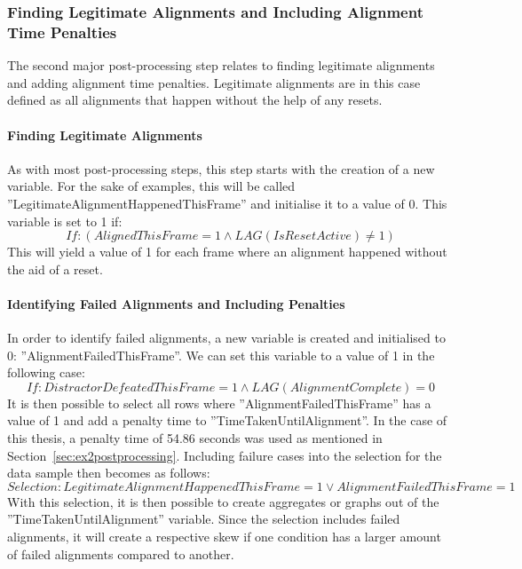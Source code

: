\subsubsection{Finding Legitimate Alignments and Including Alignment Time Penalties}
The second major post-processing step relates to finding legitimate alignments and adding alignment time penalties. Legitimate alignments are in this case defined as all alignments that happen without the help of any resets.  

\paragraph{Finding Legitimate Alignments}
As with most post-processing steps, this step starts with the creation of a new variable. For the sake of examples, this will be called ''LegitimateAlignmentHappenedThisFrame'' and initialise it to a value of 0. This variable is set to 1 if:
$$
If: (AlignedThisFrame = 1 \land LAG(IsResetActive) \neq 1)
$$
This will yield a value of 1 for each frame where an alignment happened without the aid of a reset. 

\paragraph{Identifying Failed Alignments and Including Penalties}
In order to identify failed alignments, a new variable is created and initialised to 0: ''AlignmentFailedThisFrame''. We can set this variable to a value of 1 in the following case:
$$
If: DistractorDefeatedThisFrame = 1 \land LAG(AlignmentComplete) = 0
$$
It is then possible to select all rows where ''AlignmentFailedThisFrame'' has a value of 1 and add a penalty time to ''TimeTakenUntilAlignment''. In the case of this thesis, a penalty time of 54.86 seconds was used as mentioned in Section~\ref{sec:ex2postprocessing}. Including failure cases into the selection for the data sample then becomes as follows:
$$
Selection: LegitimateAlignmentHappenedThisFrame = 1 \lor AlignmentFailedThisFrame = 1
$$
With this selection, it is then possible to create aggregates or graphs out of the ''TimeTakenUntilAlignment'' variable. Since the selection includes failed alignments, it will create a respective skew if one condition has a larger amount of failed alignments compared to another. 